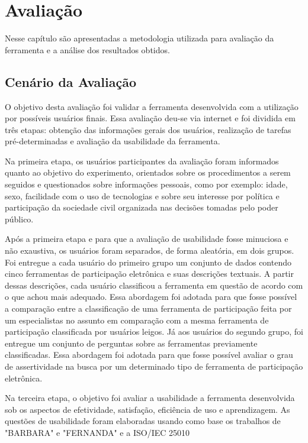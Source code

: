 \chapter[Avaliação]{Avaliação}
\label{cap:cap4}

Nesse capítulo são apresentadas a metodologia utilizada para avaliação da ferramenta e a análise dos resultados obtidos. 

\section{Cenário da Avaliação}
\label{sec:cenario}
O objetivo desta avaliação foi validar a ferramenta desenvolvida com a utilização por possíveis usuários finais. Essa avaliação deu-se via internet e foi dividida
em três etapas: obtenção das informações gerais dos usuários, realização de tarefas pré-determinadas e avaliação da usabilidade da ferramenta.


\par
Na primeira etapa, os usuários participantes da avaliação foram informados quanto ao objetivo do experimento, orientados sobre os procedimentos a serem seguidos e questionados 
sobre informações pessoais, como por exemplo: idade, sexo, facilidade com o uso de tecnologias e sobre seu interesse por política e participação da sociedade civil organizada
nas decisões tomadas pelo poder público.

\par
Após a primeira etapa e para que a avaliação de usabilidade fosse minuciosa e não exaustiva, os usuários foram separados, de forma aleatória, em dois grupos.
Foi entregue a cada usuário do primeiro grupo um conjunto de dados contendo cinco ferramentas de participação eletrônica e suas descrições textuais.
A partir dessas descrições, cada usuário classificou a ferramenta em questão de acordo com o que achou mais adequado.
Essa abordagem foi adotada para que fosse possível a comparação entre a classificação de uma ferramenta de participação feita por um especialistas no assunto em comparação com
a mesma ferramenta de participação classificada por usuários leigos.
Já aos usuários do segundo grupo, foi entregue um conjunto de perguntas sobre as ferramentas previamente classificadas. Essa abordagem foi adotada para que fosse possível avaliar
o grau de assertividade na busca por um determinado tipo de ferramenta de participação eletrônica.

\par
Na terceira etapa, o objetivo foi avaliar a usabilidade a ferramenta desenvolvida sob os aspectos de efetividade, satisfação, eficiência de uso e aprendizagem. 
As questões de usabilidade foram elaboradas usando como base os trabalhos de "BARBARA" e "FERNANDA" e a ISO/IEC 25010